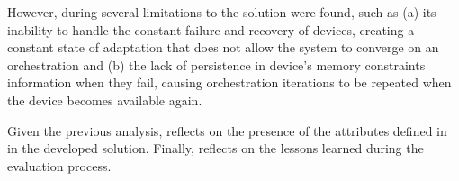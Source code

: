 However, during  several limitations to the solution were found, such as (a) its inability to handle the constant failure and recovery of devices, creating a constant state of adaptation that does not allow the system to converge on an orchestration and (b) the lack of persistence in device's memory constraints information when they fail, causing orchestration iterations to be repeated when the device becomes available again.

Given the previous analysis,  reflects on the presence of the attributes defined in  in the developed solution. Finally,  reflects on the lessons learned during the evaluation process.

